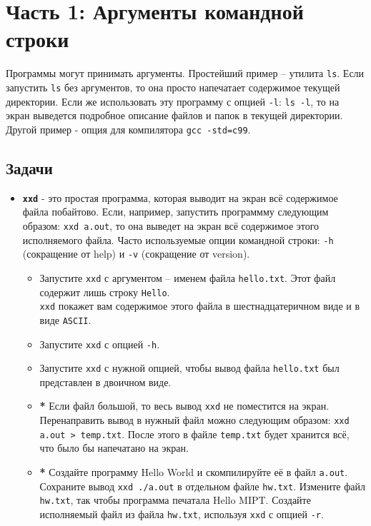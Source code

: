 \documentclass{article}
\begin{document}
\section*{Часть 1: Аргументы командной строки}
Программы могут принимать аргументы. Простейший пример -- утилита \texttt{ls}. Если запустить \texttt{ls} без аргументов, то она просто напечатает содержимое текущей директории.  Если же использовать эту программу с опцией \texttt{-l}: \texttt{ls -l}, то на экран выведется подробное описание файлов и папок в текущей директории. Другой пример - опция для компилятора \texttt{gcc -std=c99}.
\subsection*{Задачи}
\begin{itemize}
\item \textbf{\texttt{xxd}} - это простая программа, которая выводит на экран всё содержимое файла побайтово. Если, например, запустить программму следующим образом:
\texttt{xxd a.out}, то она выведет на экран всё содержимое этого исполняемого файла. Часто используемые опции командной строки: \texttt{-h} (сокращение от help) и \texttt{-v} (сокращение от version).
\begin{itemize}
\item Запустите \texttt{xxd} с аргументом -- именем файла \texttt{hello.txt}. Этот файл содержит лишь строку \texttt{Hello}.\\ 
\texttt{xxd} покажет вам содержимое этого файла в шестнадцатеричном виде и в виде \texttt{ASCII}.
\item Запустите \texttt{xxd} с опцией \texttt{-h}.
\item Запустите \texttt{xxd} с нужной опцией, чтобы вывод файла \texttt{hello.txt} был представлен в двоичном виде.
\item \textbf{*} Если файл большой, то весь вывод \texttt{xxd} не поместится на экран. Перенаправить вывод в нужный файл можно следующим образом:
\texttt{xxd a.out > temp.txt}. После этого в файле \texttt{temp.txt} будет хранится всё, что было бы напечатано на экран.
\item \textbf{*} Создайте программу Hello World и скомпилируйте её в файл \texttt{a.out}. Сохраните вывод \texttt{xxd ./a.out} в отдельном файле \texttt{hw.txt}. Измените файл \texttt{hw.txt}, так чтобы программа печатала Hello MIPT. Создайте исполняемый файл из файла \texttt{hw.txt}, используя \texttt{xxd} с опцией \texttt{-r}.
\end{itemize}


\end{itemize}
\end{document}
